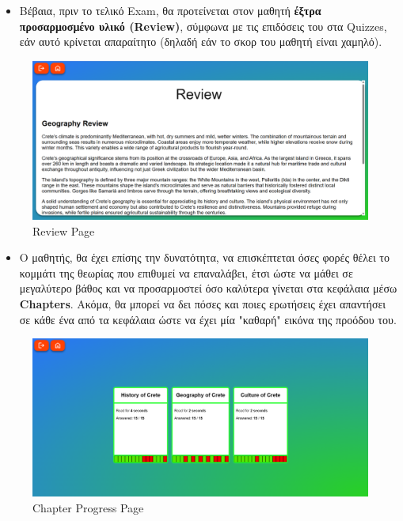 \begin{itemize}
    \item Βέβαια, πριν το τελικό \textlatin{Exam}, θα προτείνεται στον μαθητή \textbf{έξτρα προσαρμοσμένο υλικό (\textlatin{Review})}, σύμφωνα με τις επιδόσεις του στα \textlatin{Quizzes}, εάν αυτό κρίνεται απαραίτητο (δηλαδή εάν το σκορ του μαθητή είναι χαμηλό).
\end{itemize}
\begin{figure}[H]
    \centering
    \includegraphics[width=1\linewidth]{img/Review.png}
    \caption{\textlatin{Review Page}}
\end{figure}



\begin{itemize}
    \item Ο μαθητής, θα έχει επίσης την δυνατότητα, να επισκέπτεται όσες φορές θέλει το κομμάτι της θεωρίας που επιθυμεί να επαναλάβει, έτσι ώστε να μάθει σε μεγαλύτερο βάθος και να προσαρμοστεί όσο καλύτερα γίνεται στα κεφάλαια μέσω \textlatin{\textbf{Chapters}}. Ακόμα, θα μπορεί να δει πόσες και ποιες ερωτήσεις έχει απαντήσει σε κάθε ένα από τα κεφάλαια ώστε να έχει μία "καθαρή" εικόνα της προόδου του.
\end{itemize}
\begin{figure}[H]
    \centering
    \includegraphics[width=1\linewidth]{img/Chapter-Progress.png}
    \caption{\textlatin{Chapter Progress Page}}
\end{figure}

